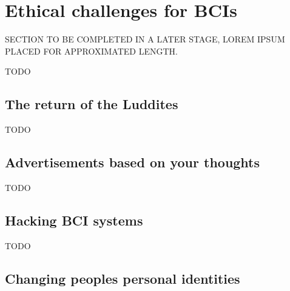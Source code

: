 
\section{Ethical challenges for BCIs}
\label{sec:bci_ethical}

SECTION TO BE COMPLETED IN A LATER STAGE, LOREM IPSUM PLACED FOR APPROXIMATED LENGTH.

TODO


\subsection{The return of the Luddites}
\label{subsec:bci_ethical_luddites}

TODO


\subsection{Advertisements based on your thoughts}
\label{subsec:bci_ethical_data_mining}

TODO


\subsection{Hacking BCI systems}
\label{subsec:bci_ethical_hacking}

TODO


\subsection{Changing peoples personal identities}
\label{subsec:bci_ethical_identity}

